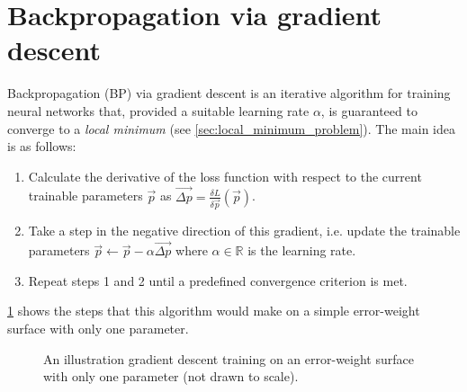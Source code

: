 \section{Backpropagation via gradient descent}
\label{sec:backpropagation}
Backpropagation (BP) via gradient descent is an iterative algorithm for training neural networks that, provided a suitable learning rate $\alpha$, is guaranteed to converge to a \textit{local minimum} (see \ref{sec:local_minimum_problem}).
The main idea is as follows:
\begin{enumerate}
    \item Calculate the derivative of the loss function with respect to the current trainable parameters $\vec{p}$ as
        $\vec{\Delta p} = \frac{\delta L}{\delta \vec{p}}\left(\vec{p}\right)$.
    \item Take a step in the negative direction of this gradient, i.e. update the trainable parameters $\vec{p} \leftarrow \vec{p} - \alpha \vec{\Delta p}$ where $\alpha \in \mathbb{R}$ is the learning rate.
    \item Repeat steps 1 and 2 until a predefined convergence criterion is met.
\end{enumerate}
\ref{fig:gradient_descent_local_minimum} shows the steps that this algorithm would make on a simple error-weight surface with only one parameter.
\begin{figure}
    \centering
    \caption{An illustration gradient descent training on an error-weight surface with only one parameter (not drawn to scale).}
    \label{fig:gradient_descent_local_minimum}
\end{figure}

